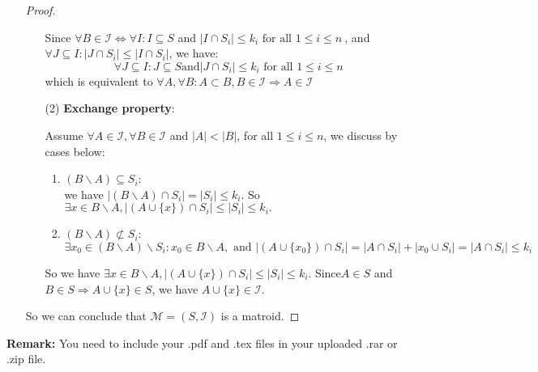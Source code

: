\documentclass[12pt,a4paper]{article}
\theoremstyle{definition}
\begin{document}
\begin{enumerate}
\begin{proof}
\begin{enumerate}
        	Since $ \forall B \in \mathcal{I} \Leftrightarrow \forall I: I \subseteq S$ and $ |I \cap S_i| \leq k_i \text { for all } 1 \leq i \leq n\ $,
        	 and $ \forall J \subseteq I: |J \cap S_i| \leq |I \cap S_i| $, we have:
        	$$ \forall J \subseteq I:  J\subseteq S \text{and}  |J \cap S_i| \leq k_i \text { for all } 1 \leq i \leq n\ $$
        	which is equivalent to $ \forall A ,\forall B: A \subset B, B \in \mathcal{I} \Rightarrow A\in\mathcal{I} $
        	\item[(2)] \textbf{Exchange property}:
        	
        	Assume $ \forall A\in \mathcal{I},\forall B\in \mathcal{I} $ and $ |A| < |B| $, for all $ 1\leq i \leq n $, we discuss by cases below:
        	\begin{enumerate}
        		\item $ (B\backslash A)\subseteq S_i $:\\ we have $ |(B\backslash A) \cap S_{i}| = |S_{i}| \leq k_{i} $. So $ \exists x\in B\backslash A,|(A\cup \{x\})\cap S_i|\leq|S_i| \leq k_i.$
        		\item $ (B\backslash A)\not\subset S_i $:\\
        		$ \exists x_{0} \in (B\backslash A)\backslash S_i : x_{0} \in B\backslash A, \text{ and }|(A\cup \{x_{0}\})\cap S_i| = |A \cap S_i|+ |{x_{0}} \cup S_i| = |A \cap S_i| \leq k_i$
        	\end{enumerate} 
        	So we have $\exists x\in B\backslash A, |(A\cup \{x\})\cap S_i|\leq|S_i| \leq k_i $. Since$ A\in S$ and $ B\in S \Rightarrow A\cup \{x\}\in S$, we have $ A\cup \{x\}\in \mathcal{I}$. 
        \end{enumerate}
    So we can conclude that $\mathcal{M}=(S,\mathcal{I})$ is a matroid.
    \end{proof}

\end{enumerate}

\vspace{20pt}

\textbf{Remark:} You need to include your .pdf and .tex files in your uploaded .rar or .zip file.

\end{document}
